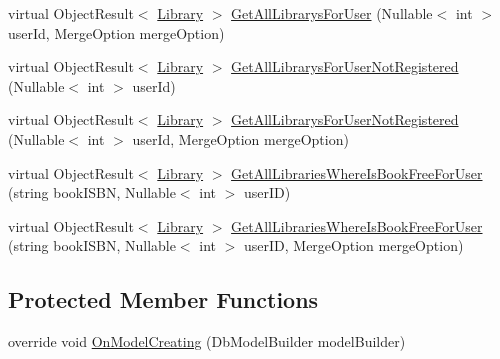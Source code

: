 \begin{DoxyCompactItemize}
\item 
virtual Object\+Result$<$ \mbox{\hyperlink{class_easy_library_application_1_1_w_p_f_1_1_model_1_1_library}{Library}} $>$ \mbox{\hyperlink{class_easy_library_application_1_1_w_p_f_1_1_model_1_1_library_entities_a5d7dba8d4df0510125d3099544bdc446}{Get\+All\+Librarys\+For\+User}} (Nullable$<$ int $>$ user\+Id, Merge\+Option merge\+Option)
\item 
virtual Object\+Result$<$ \mbox{\hyperlink{class_easy_library_application_1_1_w_p_f_1_1_model_1_1_library}{Library}} $>$ \mbox{\hyperlink{class_easy_library_application_1_1_w_p_f_1_1_model_1_1_library_entities_aab81a8213f268a6145002a2b48f9e5f8}{Get\+All\+Librarys\+For\+User\+Not\+Registered}} (Nullable$<$ int $>$ user\+Id)
\item 
virtual Object\+Result$<$ \mbox{\hyperlink{class_easy_library_application_1_1_w_p_f_1_1_model_1_1_library}{Library}} $>$ \mbox{\hyperlink{class_easy_library_application_1_1_w_p_f_1_1_model_1_1_library_entities_a916e19251929ee6cc10c7c16207963d9}{Get\+All\+Librarys\+For\+User\+Not\+Registered}} (Nullable$<$ int $>$ user\+Id, Merge\+Option merge\+Option)
\item 
virtual Object\+Result$<$ \mbox{\hyperlink{class_easy_library_application_1_1_w_p_f_1_1_model_1_1_library}{Library}} $>$ \mbox{\hyperlink{class_easy_library_application_1_1_w_p_f_1_1_model_1_1_library_entities_a9aa5fedbe4c2a5ab5f186cee08816695}{Get\+All\+Libraries\+Where\+Is\+Book\+Free\+For\+User}} (string book\+I\+S\+BN, Nullable$<$ int $>$ user\+ID)
\item 
virtual Object\+Result$<$ \mbox{\hyperlink{class_easy_library_application_1_1_w_p_f_1_1_model_1_1_library}{Library}} $>$ \mbox{\hyperlink{class_easy_library_application_1_1_w_p_f_1_1_model_1_1_library_entities_acbdab1601ec88b793113cfe81f7c1584}{Get\+All\+Libraries\+Where\+Is\+Book\+Free\+For\+User}} (string book\+I\+S\+BN, Nullable$<$ int $>$ user\+ID, Merge\+Option merge\+Option)
\end{DoxyCompactItemize}
\subsection*{Protected Member Functions}
\begin{DoxyCompactItemize}
\item 
override void \mbox{\hyperlink{class_easy_library_application_1_1_w_p_f_1_1_model_1_1_library_entities_a7a85e341ed9b0f25d348b1c0d099b2e9}{On\+Model\+Creating}} (Db\+Model\+Builder model\+Builder)
\end{DoxyCompactItemize}
